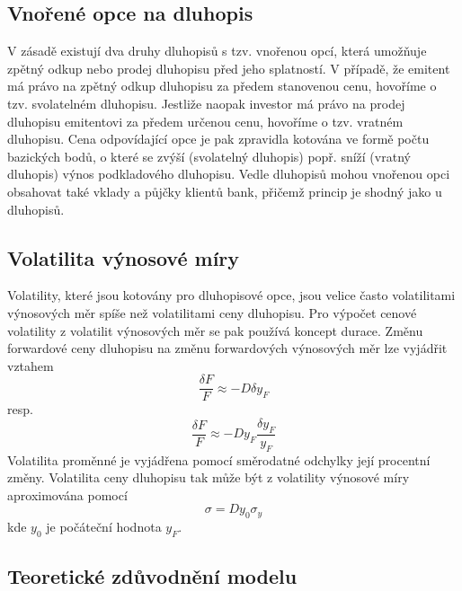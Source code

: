 \documentclass[a4paper]{book}
\begin{document}
\subsection{Vnořené opce na dluhopis}

V zásadě existují dva druhy dluhopisů s tzv. vnořenou opcí, která umožňuje zpětný odkup nebo prodej dluhopisu před jeho splatností. V případě, že emitent má právo na zpětný odkup dluhopisu za předem stanovenou cenu, hovoříme o tzv. svolatelném dluhopisu. Jestliže naopak investor má právo na prodej dluhopisu emitentovi za předem určenou cenu, hovoříme o tzv. vratném dluhopisu. Cena odpovídající opce je pak zpravidla kotována ve formě počtu bazických bodů, o které se zvýší (svolatelný dluhopis) popř. sníží (vratný dluhopis) výnos podkladového dluhopisu.
Vedle dluhopisů mohou vnořenou opci obsahovat také vklady a půjčky klientů bank, přičemž princip je shodný jako u dluhopisů.

\subsection{Volatilita výnosové míry}

Volatility, které jsou kotovány pro dluhopisové opce, jsou velice často volatilitami výnosových měr spíše než volatilitami ceny dluhopisu. Pro výpočet cenové volatility z volatilit výnosových měr se pak používá koncept durace. Změnu forwardové ceny dluhopisu na změnu forwardových výnosových měr lze vyjádřit vztahem
\begin{equation*}
\frac{\delta F}{F} \approx -D \delta y_F
\end{equation*}
resp.
\begin{equation*}
\frac{\delta F}{F} \approx -D y_F \frac{\delta y_F}{y_F}
\end{equation*}
 Volatilita proměnné je vyjádřena pomocí směrodatné odchylky její procentní změny. Volatilita ceny dluhopisu tak může být z volatility výnosové míry aproximována pomocí
\begin{equation*}
\sigma = D y_0 \sigma_y
\end{equation*}
kde $y_0$ je počáteční hodnota $y_F$.

\subsection{Teoretické zdůvodnění modelu}
\end{document}
